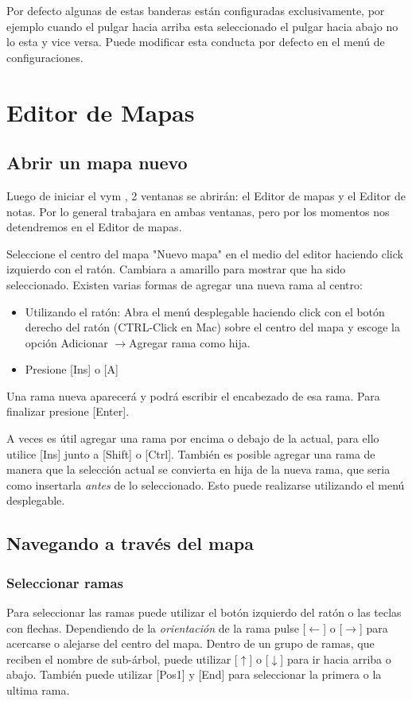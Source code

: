 \documentclass{article}
\newcommand{\vym}{{\sc vym }}
\newcommand{\ra}{$\longrightarrow$}
\newcommand{\la}{$\longleftarrow$}
\newcommand{\ua}{$\uparrow$}
\newcommand{\da}{$\downarrow$}
\newcommand{\key}[1]{[#1]}
\begin{document}
Por defecto algunas de estas banderas est\'an configuradas exclusivamente, por ejemplo cuando el pulgar hacia arriba esta seleccionado el pulgar hacia abajo no lo esta y vice versa. Puede modificar esta conducta por defecto en el men\' u de configuraciones.

\section{Editor de Mapas} \label {mapeditor}
\subsection{Abrir un mapa nuevo}
Luego de iniciar el \vym, 2 ventanas se abrir\'an: el Editor de mapas y el Editor de notas. Por lo general trabajara en ambas ventanas, pero por los momentos nos detendremos en el Editor de mapas.

Seleccione el centro del mapa "Nuevo mapa" en el medio del editor haciendo click izquierdo con el rat\'on. Cambiara a amarillo para mostrar que ha sido seleccionado. Existen varias formas de agregar una nueva rama al centro:
\begin{itemize}
	\item Utilizando el rat\'on: Abra el men\'u desplegable haciendo click con el bot\'on derecho del rat\'on (CTRL-Click en Mac) sobre el centro del mapa y escoge la opci\'on Adicionar \ra Agregar rama como hija. 
	\item Presione \key{Ins} o \key{A}
\end{itemize}
Una rama nueva aparecer\'a y podr\'a escribir el encabezado de esa rama. Para finalizar presione \key{Enter}.

A veces es \'util agregar una rama por encima o debajo de la actual, para ello utilice \key{Ins} junto a \key{Shift} o \key{Ctrl}. Tambi\'en es posible agregar una rama de manera que la selecci\'on actual se convierta en hija de la nueva rama, que seria como insertarla {\em antes} de lo seleccionado. Esto puede realizarse utilizando el men\'u desplegable.

\subsection{Navegando a trav\'es del mapa}
\subsubsection*{Seleccionar ramas}

Para seleccionar las ramas puede utilizar el bot\'on izquierdo del rat\'on o las teclas con flechas. Dependiendo de la {\em orientaci\'on} de la rama pulse \key{\la} o \key{\ra} para acercarse o alejarse del centro del mapa. Dentro de un grupo de ramas, que reciben el nombre de sub-\'arbol, puede utilizar \key{\ua} o \key{\da} para ir hacia arriba o abajo. Tambi\'en puede utilizar \key{Pos1} y \key{End} para seleccionar la primera o la ultima rama.
\end{document}
